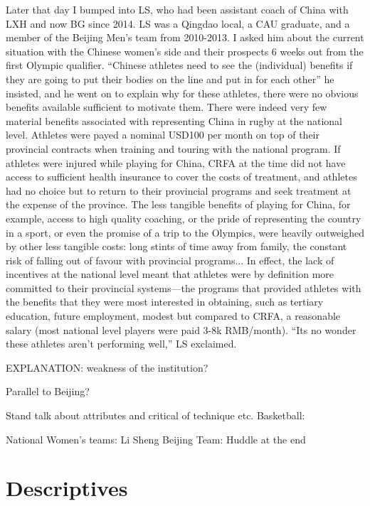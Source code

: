 Later that day I bumped into LS, who had been assistant coach of China with LXH and now BG since 2014.  LS was a Qingdao local, a CAU graduate, and a member of the Beijing Men's team from 2010-2013.  I asked him about the current situation with the Chinese women's side and their prospects 6 weeks out from the first Olympic qualifier.  ``Chinese athletes need to see the (individual) benefits if they are going to put their bodies on the line and put in for each other'' he insisted, and he went on to explain why for these athletes, there were no obvious benefits available sufficient to motivate them.  There were indeed very few material benefits associated with representing China in rugby at the national level.  Athletes were payed a nominal USD100 per month on top of their provincial contracts when training and touring with the national program.  If athletes were injured while playing for China, CRFA at the time did not have access to sufficient health insurance to cover the costs of treatment, and athletes had no choice but to return to their provincial programs and seek treatment at the expense of the province.  The less tangible benefits of playing for China, for example, access to high quality coaching, or the pride of representing the country in a sport, or even the promise of a trip to the Olympics, were heavily outweighed by other less tangible costs: long stints of time away from family, the constant risk of falling out of favour with provincial programs...  In effect, the lack of incentives at the national level meant that athletes were by definition more committed to their provincial systems---the programs that provided athletes with the benefits that they were most interested in obtaining, such as tertiary education, future employment, modest but compared to CRFA, a reasonable salary (most national level players were paid 3-8k RMB/month). ``Its no wonder these athletes aren't performing well,'' LS exclaimed.

EXPLANATION: weakness of the institution?

Parallel to Beijing?


Stand talk about attributes and critical of technique etc.
Basketball:



National Women's teams: Li Sheng
Beijing Team: Huddle at the end










\section{Descriptives}

